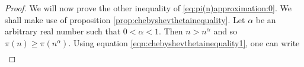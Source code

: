 \begin{proof}
		We will now prove the other inequality of \eqref{eq:pi(n)approximation:0}. We shall make use of proposition \eqref{prop:chebyshevthetainequality}. 
		Let $\alpha$ be an arbitrary real number such that $0 < \alpha < 1$. Then $n> n^{\alpha}$ and so $\pi(n) \geq \pi(n^{\alpha})$. Using equation \eqref{eqn:chebyshevthetainequality1}, one can write
			\begin{align*}

\end{align*}
\end{proof}
